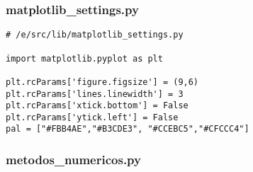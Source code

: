 \subsubsection{matplotlib\_settings.py}
\begin{verbatim}
# /e/src/lib/matplotlib_settings.py

import matplotlib.pyplot as plt

plt.rcParams['figure.figsize'] = (9,6)
plt.rcParams['lines.linewidth'] = 3
plt.rcParams['xtick.bottom'] = False
plt.rcParams['ytick.left'] = False
pal = ["#FBB4AE","#B3CDE3", "#CCEBC5","#CFCCC4"]
\end{verbatim}


\subsubsection{metodos\_numericos.py}
